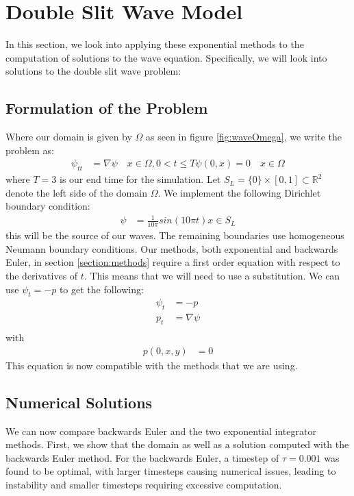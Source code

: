 \section{Double Slit Wave Model}

In this section, we look into applying these exponential methods to the computation of solutions to the wave equation.
Specifically, we will look into solutions to the double slit wave problem:

\subsection{Formulation of the Problem}
Where our domain is given by $\Omega$ as seen in figure \ref{fig:waveOmega}, we write the problem as:
\begin{align*}
    \psi_{tt} &= \nabla \psi \quad x \in \Omega, 0<t\leq T
    \psi(0,x) = 0 \quad x \in \Omega
\end{align*}
where $T=3$ is our end time for the simulation.
Let $S_L = \{0\} \times [0,1] \subset \mathbb{R}^2$ denote the left side of the domain $\Omega$.
We implement the following Dirichlet boundary condition:
\begin{align*}
    \psi &= \frac{1}{10\pi} sin(10\pi t) x \in S_L
\end{align*}
this will be the source of our waves.
The remaining boundaries use homogeneous Neumann boundary conditions.
Our methods, both exponential and backwards Euler, in section \ref{section:methods} require a first order equation with respect to the derivatives of $t$.
This means that we will need to use a substitution.
We can use $\psi_t = -p$ to get the following:
\begin{align*}
    \psi_t &= -p\\
    p_t &= \nabla \psi\\
\end{align*}
with
\begin{align*}
    p(0,x,y) &= 0
\end{align*}
This equation is now compatible with the methods that we are using.

\subsection{Numerical Solutions}
We can now compare backwards Euler and the two exponential integrator methods.
First, we show that the domain as well as a solution computed with the backwards Euler method.
For the backwards Euler, a timestep of $\tau = 0.001$ was found to be optimal, with larger timesteps causing numerical issues, leading to instability and smaller timesteps requiring excessive computation.

